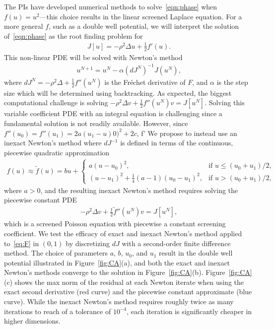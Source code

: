 The PIs have developed numerical methods to solve~\eqref{eqn:phase} when
$f(u) = u^2$---this choice results in the linear screened Laplace
equation. For a more general $f$, such as a double well potential, we
will interpret the solution of~\eqref{eqn:phase} as the root finding
problem for
\begin{align}
  \label{eq:F}
  J[u] = -\rho^2 \Delta u + \tfrac{1}{2}f'(u).
\end{align}
This non-linear PDE will be solved with Newton's method
\begin{align*}
  u^{N+1} = u^{N} - \alpha (dJ^N)^{-1} J(u^N),
\end{align*}
where $dJ^N = -\rho^2 \Delta + \tfrac{1}{2}f''(u^N)$ is the Fr\'{e}chet
derivative of $F$, and $\alpha$ is the step size which will be
determined using backtracking. As expected, the biggest computational
challenge is solving $- \rho^2 \Delta v + \tfrac{1}{2}f''(u^{N}) v =
J[u^N]$. Solving this variable coefficient PDE with an integral equation
is challenging since a fundamental solution is not readily available.
However, since $f''(u_0) = f''(u_1) = 2a(u_1 - u)0)^2 + 2c$, f' We
propose to instead use an inexact Newton's method where $dJ^{-1}$ is
defined in terms of the continuous, piecewise quadratic approximation
\begin{align*}
  f(u) \approx \tilde{f}(u) = bu + \begin{cases}
    a(u - u_0)^2, &\mbox{if } u \leq (u_0 + u_1)/2, \\
    (u - u_1)^2 + \tfrac{1}{4}(a-1)(u_0-u_1)^2 , &\mbox{if } u > (u_0 + u_1)/2,
  \end{cases}
\end{align*}
where $a>0$, and the resulting inexact Newton's method requires solving
the piecewise constant PDE
\begin{align}
  \label{eq:screenedPoisson}
  -\rho^2 \Delta v + \tfrac{1}{2}\tilde{f}''(u^{N})v = J[u^N],
\end{align}
which is a screened Poisson equation with piecewise a constant screening
coefficient. We test the efficacy of exact and inexact Newton's method
applied to~\eqref{eq:F} in $(0,1)$ by discretizing $dJ$ with a
second-order finite difference method. The choice of parameters $a$,
$b$, $u_0$, and $u_1$ result in the double well potential illustrated in
Figure~\ref{fig:CA}(a), and both the exact and inexact Newton's methods
converge to the solution in Figure~\ref{fig:CA}(b).
Figure~\ref{fig:CA}(c) shows the max norm of the residual at each Newton
iterate when using the exact second derivative (red curve) and the
piecewise constant approximate (blue curve). While the inexact Newton's
method requires roughly twice as many iterations to reach of a tolerance
of $10^{-4}$, each iteration is significantly cheaper in higher
dimensions.

